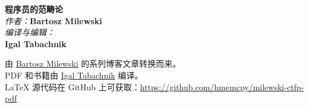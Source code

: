

\thispagestyle{empty}

\vspace*{80pt}

\begin{raggedleft}
  \fontsize{24pt}{24pt}\selectfont
  \textbf{程序员的范畴论}\\
  \ifdefined{}
  \fi
  \vspace*{1cm}
  \fontsize{16pt}{18pt}\selectfont \textit{作者：}\textbf{Bartosz Milewski}\\
  \vspace{1cm}
  \fontsize{12pt}{14pt}\selectfont \textit{编译与编辑：}\\ \textbf{Igal Tabachnik}\\

\end{raggedleft}


\newpage

\vspace*{0.3\textheight}
\thispagestyle{empty}

    \vspace{1.26em}
    \noindent
    由 \href{https://bartoszmilewski.com/2014/10/28/category-theory-for-programmers-the-preface/}{Bartosz Milewski} 的系列博客文章转换而来。\\
    PDF 和书籍由 \href{https://hmemcpy.com}{Igal Tabachnik} 编译。\\
    \vspace{1.26em}
    \noindent
    \LaTeX{} 源代码在 GitHub 上可获取：\href{https://github.com/hmemcpy/milewski-ctfp-pdf}{https://github.com/hmemcpy/milewski-ctfp-pdf}